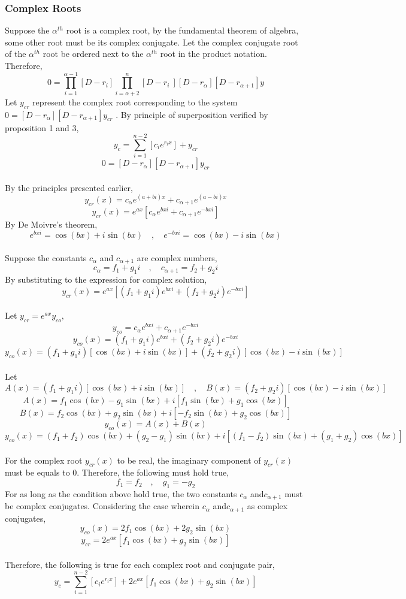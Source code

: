 \documentclass[a4paper, 12pt]{report}
\def\a{\alpha}
\def\l{\left}
\def\r{\right}
\begin{document}
\begin{center}
\subsubsection{Complex Roots}
Suppose the $\a^{th}$ root is a complex root, by the fundamental theorem of algebra, some other root must be its complex conjugate. Let the complex conjugate root of the $\a^{th}$ root be ordered next to the $\a^{th}$ root in the product notation. Therefore, 
$$0 = \prod_{i = 1}^{\a - 1}\l[D - r_i \r]\prod_{i = \a + 2}^{n}\l[D - r_i\ \r][D - r_{\a}][D - r_{\a +1 }]y$$
Let $y_{cr}$ represent the complex root corresponding to the system $0 = [D - r_{\a}][D - r_{\a +1 }]y_{cr}$ . By principle of superposition verified by proposition 1 and 3, 
$$y_c = \sum_{i = 1}^{n - 2}\l[c_i e^{r_i x}\r] + y_{cr}$$
$$0 = [D - r_{\a}][D - r_{\a +1 }]y_{cr}$$
\\By the principles presented earlier,
$$y_{cr}(x) = c_{\a} e^{(a + bi)x} +c_{\a + 1} e^{(a - bi)x}$$
$$y_{cr}(x) = e^{ax}\l[c_{\a} e^{bxi} +c_{\a + 1} e^{- bxi}\r]$$
By De Moivre's theorem,
$$e^{bxi} = \cos{(bx)} + i\sin{(bx)} \quad, \quad e^{-bxi} = \cos{(bx)} - i\sin{(bx)}$$
\\Suppose the constants $c_{\a}$ and $c_{\a + 1}$ are complex numbers,
$$c_{\a} = f_1 + g_1 i \quad, \quad c_{\a + 1} = f_2 + g_2 i$$
By substituting to the expression for complex solution,
$$y_{cr}(x) = e^{ax}\l[(f_1 + g_1 i) e^{bxi} + (f_2 + g_2 i) e^{- bxi}\r]$$
\\Let $y_{cr} = e^{ax} y_{co},$
$$y_{co} = c_{\a} e^{bxi} + c_{\a + 1} e^{- bxi}$$
$$y_{co}(x) =(f_1 + g_1 i) e^{bxi} + (f_2 + g_2 i) e^{- bxi}$$
$$y_{co}(x) =(f_1 + g_1 i)[\cos{(bx)} + i\sin{(bx)}]  + (f_2 + g_2 i) [\cos{(bx)} - i\sin{(bx)}]$$
\\Let
$$A(x) = (f_1 + g_1 i)[\cos{(bx)} + i\sin{(bx)}]\quad , \quad B(x) = (f_2 + g_2 i) [\cos{(bx)} - i\sin{(bx)}]$$
$$A(x) = f_1\cos{(bx)} - g_1 \sin{(bx)} + i[f_1\sin{(bx)} + g_1\cos{(bx)}]$$
$$ B(x) = f_2\cos{(bx)} + g_2 \sin{(bx)} + i[ - f_2\sin{(bx)} + g_2\cos{(bx)}]$$
$$y_{co}(x) = A(x) + B(x)$$
$$y_{co}(x) = (f_1 + f_2)\cos{(bx)} + (g_2 - g_1 )\sin{(bx)} + i[(f_1 - f_2)\sin{(bx)} + (g_1 + g_2)\cos{(bx)}]$$
\\For the complex root $y_{cr}(x)$ to be real, the imaginary component of $y_{cr}(x)$ must be equals to $0$. Therefore, the following must hold true,
$$f_1 = f_2 \quad, \quad g_1 = -g_2$$
For as long as the condition above hold true, the two constants $c_{\a}$ and$c_{\a + 1}$ must be complex conjugates. Considering the case wherein $c_{\a}$ and$c_{\a + 1}$ as complex conjugates,
$$y_{co}(x) = 2 f_1\cos{(bx)} + 2 g_2\sin{(bx)}$$
$$y_{cr} = 2e^{ax}[f_1\cos{(bx)} + g_2\sin{(bx)}]$$
\\Therefore, the following is true for each complex root and conjugate pair,
$$y_c = \sum_{i = 1}^{n - 2}\l[c_i e^{r_i x}\r] + 2e^{ax}[f_1\cos{(bx)} + g_2\sin{(bx)}]$$

\end{center}
\end{document}
